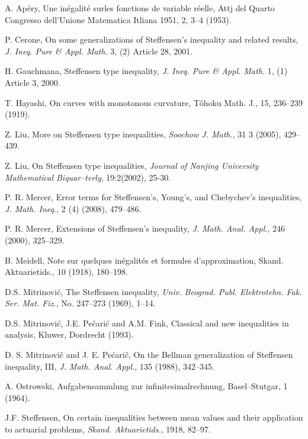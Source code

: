 \documentclass{amsart}
\theoremstyle{plain}
\numberwithin{equation}{section}
\begin{document}
\begin{thebibliography}{9}
\setlength{\itemsep}{5pt}

A. Ap\'{e}ry, Une in\'{e}galit\'{e} surles fonctions de variable
r\'{e}elle, Attj del Quarto Congresso dell'Unione Matematica
Itliana 1951, 2, 3--4 (1953).

P. Cerone, On some generalizations of Steffensen's inequality and
related results, \textit{J. Ineq. Pure \& Appl. Math.} 3, (2)
Article 28, 2001.

H. Gauchmana, Steffensen type inequality, \textit{J. Ineq. Pure \&
Appl. Math.} 1, (1) Article 3, 2000.

T. Hayashi, On curves with monotonous curvature, T\^{o}hoku Math.
J., 15, 236--239 (1919).

Z. Liu, More on Steffensen type inequalities, \textit{Soochow J.
Math.}, 31 3 (2005), 429--439.

Z. Liu, On Steffensen type inequalities, \textit{Journal of
Nanjing University Mathematical Biquar--terly}, 19:2(2002), 25-30.


P. R. Mercer, Error terms for Steffensen's, Young's, and
Chebychev's inequalities, \textit{J. Math. Ineq.}, 2 (4) (2008),
479--486.

P. R. Mercer, Extensions of Steffensen's inequality, \textit{J.
Math. Anal. Appl.}, 246 (2000), 325--329.

B. Meidell, Note sur quelques in\'{e}galit\'{e}s et formules
d'approximation, Skand. Aktuarietids., 10 (1918), 180--198.

D.S. Mitrinovi\'{c}, The Steffensen inequality, \textit{Univ.
Beograd. Publ. Elektrotehn. Fak. Ser. Mat. Fiz.}, No. 247--273
(1969), 1--14.

D.S. Mitrinovi\'{c}, J.E. Pe\v{c}ari\'{c} and A.M. Fink, Classical
and new inequalities in analysis, Kluwer, Dordrecht (1993).

D. S. Mitrinovi\v{c} and J. E. Pe\'{c}ari\v{c}, On the Bellman
generalization of Steffensen inequality, III, \textit{J. Math.
Anal. Appl.}, 135 (1988), 342--345.

A. Ostrowski, Aufgabensammlung zur infinitesimalrechnung,
Basel--Stutgar, 1 (1964).

J.F. Steffensen, On certain inequalities between mean values and
their application to actuarial problems, \textit{Skand.
Aktuarietids.},  1918, 82--97.


\end{thebibliography}
\end{document}
